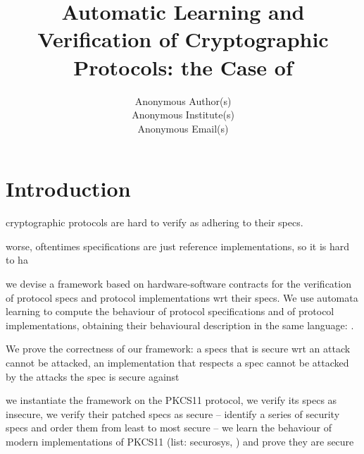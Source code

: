 \documentclass[conference]{IEEEtran}
\begin{document}

\date{}

\title{
  \Large \bf
  Automatic Learning and Verification of Cryptographic Protocols: the Case of \pkcs
}

\author{
{Anonymous Author(s)}
\\
{Anonymous Institute(s)}
\\
{Anonymous Email(s)}
} %

\maketitle

\begin{abstract}
\end{abstract}


\section{Introduction}\label{sec:intro}


cryptographic protocols are hard to verify as adhering to their specs.

worse, oftentimes specifications are just reference implementations, so it is hard to ha

we devise a framework based on hardware-software contracts for the verification of protocol specs and protocol implementations wrt their specs.
We use automata learning to compute the behaviour of protocol specifications and of protocol implementations, obtaining their behavioural description in the same language: .



We prove the correctness of our framework: a specs that is secure wrt an attack cannot be attacked, an implementation that respects a spec cannot be attacked by the attacks the spec is secure against 

we instantiate the framework on the PKCS11 protocol,
we verify its specs as insecure,
we verify their patched specs as secure -- identify a series of security specs and order them from least to most secure --
we learn the behaviour of modern implementations of PKCS11 (list: securosys, ) and prove they are secure
\end{document}

